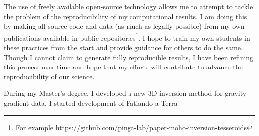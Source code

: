 \documentclass[12pt]{article}
\begin{document}
%
The use of freely available open-source technology
allows me to attempt to tackle
the problem of the reproducibility of my computational results.
%
I am doing this by
making all source-code and data (as much as legally possible)
from my own publications
available in public
repositories\footnote{For example
\url{https://github.com/pinga-lab/paper-moho-inversion-tesseroids}}.
%
I hope to train my own students
in these practices from the start
and provide guidance for others to do the same.
%
Though I cannot claim
to generate fully reproducible results,
I have been refining this process over time
and hope that my efforts will contribute
to advance the reproducibility of our science.


%
During my Master's degree,
I developed a new 3D inversion method
for gravity gradient data.
I started development of Fatiando a Terra


\end{document}
